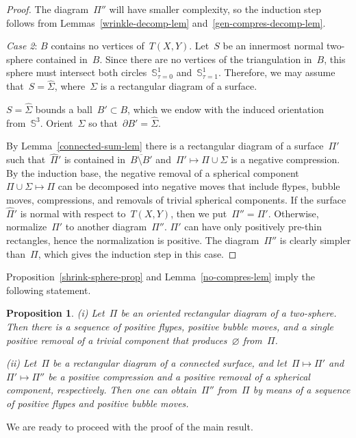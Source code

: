 \documentclass{amsart}
\theoremstyle{theorem}
\newtheorem{prop}[theo]{Proposition}
\theoremstyle{remark}
\theoremstyle{definition}
\numberwithin{equation}{section}
\numberwithin{figure}{section}
\begin{document}
\begin{proof}
The diagram~$\Pi''$ will have smaller complexity, so the induction step follows from
Lemmas~\ref{wrinkle-decomp-lem} and~\ref{gen-compres-decomp-lem}.

\smallskip\noindent\emph{Case 2}: $B$ contains no vertices of~$T(X,Y)$. Let~$S$ be an innermost normal
two-sphere contained in~$B$. Since there are no vertices of the triangulation in~$B$, this sphere
must intersect both circles~$\mathbb S^1_{\tau=0}$ and~$\mathbb S^1_{\tau=1}$. Therefore,
we may assume that~$S=\widehat\Sigma$, where~$\Sigma$ is a rectangular diagram of a surface.

$S=\widehat\Sigma$ bounds a ball~$B'\subset B$, which we endow with the induced orientation from~$\mathbb S^3$.
Orient~$\Sigma$ so that~$\partial B'=\widehat\Sigma$.

By  Lemma~\ref{connected-sum-lem} there is a rectangular diagram of a surface~$\Pi'$ such that~$\widehat\Pi'$
is contained in~$\overline{B\setminus B'}$ and~$\Pi'\mapsto\Pi\cup\Sigma$ is a negative compression.
By the induction base, the negative removal of a spherical component~$\Pi\cup\Sigma\mapsto\Pi$
can be decomposed into negative moves that include flypes, bubble moves, compressions, and removals of
trivial spherical components. If the surface~$\widehat\Pi'$ is normal with respect to~$T(X,Y)$, then we put~$\Pi''=\Pi'$.
Otherwise, normalize~$\Pi'$ to another diagram~$\Pi''$. $\Pi'$ can have only positively pre-thin
rectangles, hence the normalization is positive. The diagram~$\Pi''$ is clearly simpler than~$\Pi$, which gives the induction step in this case.
\end{proof}

Proposition~\ref{shrink-sphere-prop} and Lemma~\ref{no-compres-lem} imply the following statement.

\begin{prop}\label{only-flypes-bubble-prop}
\emph{(i)} Let~$\Pi$ be an oriented rectangular diagram of a two-sphere. Then there is a sequence
of positive flypes, positive bubble moves, and a single positive removal of a trivial component that produces~$\varnothing$
from~$\Pi$.

\emph{(ii)}
Let~$\Pi$ be a rectangular diagram of a connected surface, and let~$\Pi\mapsto\Pi'$ and~$\Pi'\mapsto\Pi''$
be a positive compression and a positive removal of a spherical component, respectively. Then one
can obtain~$\Pi''$ from~$\Pi$ by means of a sequence of positive flypes and positive bubble moves.
\end{prop}

We are ready to proceed with the proof of the main result.
\end{document}
